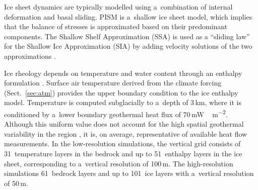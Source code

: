 \documentclass[tc, manuscript]{copernicus}
\begin{document}
      Ice sheet dynamics are typically modelled using a~combination of
      internal deformation and basal sliding. PISM is a~shallow ice sheet
      model, which implies that the balance of stresses is approximated
      based on their predominant components. The Shallow Shelf Approximation
      (SSA) is used as a ``sliding law'' for the Shallow Ice Approximation
      (SIA) by adding velocity solutions of the two approximations
      \citep[Eqns.~7--9 and 15]{Bueler.Brown.2009, Winkelmann.etal.2011}.

      Ice rheology depends on temperature and water content through an
      enthalpy formulation \citep{Aschwanden.etal.2012}. Surface air
      temperature derived from the climate forcing (Sect.~\ref{sec:atm})
      provides the upper boundary condition to the ice enthalpy
      model. Temperature is computed subglacially to a~depth of
      3\,\unit{km}, where it is conditioned by a~lower boundary geothermal
      heat flux of 70\,\unit{mW\,m^{-2}}. Although this uniform value does
      not account for the high spatial geothermal variability in the region
      \citep{Blackwell.Richards.2004}, it is, on average, representative of
      available heat flow measurements. In the low-resolution simulations,
      the vertical grid consists of 31~temperature layers in the bedrock and
      up to 51~enthalpy layers in the ice sheet, corresponding to a~vertical
      resolution of 100\,\unit{m}. The high-resolution simulations
      61~bedrock layers and up to 101~ice layers with a~vertical resolution
      of 50\,\unit{m}.
\end{document}
